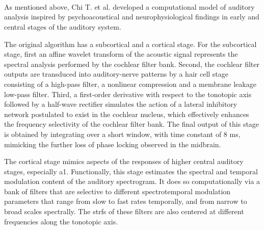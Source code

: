 \documentclass[10pt,letterpaper]{article}
\begin{document}
~\\
~\\
~\\

As mentioned above, Chi T. et al. \cite{chi_2005} developed a computational model of auditory analysis inspired by psychoacoustical and
neurophysiological findings in early and central stages of the auditory system.

The original algorithm has a subcortical and a cortical stage.
For the subcortical stage, first an affine wavelet transform of the acoustic signal
represents the spectral analysis performed by the cochlear filter bank.
Second, the cochlear filter outputs are transduced into auditory-nerve
patterns by a hair cell stage consisting of a high-pass filter,
a nonlinear compression and a membrane leakage low-pass filter.
Third, a first-order derivative with respect to the tonotopic axis
followed by a half-wave rectifier
simulates the action of a lateral inhibitory
network postulated to exist in the cochlear nucleus,
which effectively enhances the frequency
selectivity of the cochlear filter bank.
The final output of this stage is obtained by integrating
over a short window, with time constant of 8 ms, mimicking
the further loss of phase locking observed
in the midbrain.

The cortical stage mimics aspects of the responses of higher
central auditory stages, especially \gls{a1}.
Functionally, this stage estimates the
spectral and temporal modulation content of the auditory
spectrogram. It does so computationally via a bank of filters
that are selective to different spectrotemporal modulation parameters
that range from slow to fast rates temporally, and
from narrow to broad scales spectrally. The \glspl{strf}
of these filters are also centered at
different frequencies along the tonotopic axis.
\end{document}
